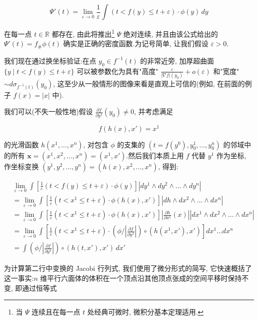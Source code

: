 \[
\Psi'(t) = \lim_{\varepsilon\to 0}\frac{1}{\varepsilon}\int(t<f(y)\leq t+\varepsilon)\cdot\phi(y)\, dy
\]

在每一点 $t\in\mathbb{R}$ 都存在, 由此将推出\footnote{当 $\Psi$ 连续且在每一点 $t$ 处经典可微时, 微积分基本定理适用.} $\Psi$ 绝对连续, 并且由该公式给出的 $\Psi'(t) = f_{\#}\phi(t)$ 确实是正确的密度函数.为记号简单, 让我们假设 $\varepsilon>0$.

我们现在通过换坐标验证:在点 $y_0\in f^{-1}(t)$ 的非常近旁, 加厚超曲面 $\{y \mid t<f(y)\leq t+\varepsilon\}$ 可以被参数化为具有"高度" $\frac{\varepsilon}{|\nabla f|(y_0)} + o(\varepsilon)$ 和"宽度" $\sim d\sigma_{f^{-1}(t)}(y_0)$, 这至少从一般情形的图像来看是直观上可信的(例如, 在前面的例子 $f(x) = |x|$ 中).

我们可以(不失一般性地)假设 $\frac{\partial f}{\partial y^1}(y_0)\neq 0$, 并考虑满足

\begin{equation}
f(h(x), x') = x^1\label{eq:c3-135}
\end{equation}

的光滑函数 $h(x^1, \ldots, x^n)$, 对包含 $\phi$ 的支集的 $(t = f(y^0), y_0^1, \ldots, y_0^n)$ 的邻域中的所有 $\boldsymbol{x} = (x^1, x^2, \ldots, x^n) = (x^1, x')$.然后我们本质上用 $f$ 代替 $y^1$ 作为坐标, 作坐标变换 $(y^1, y^2, \ldots, y^n) = (h(x), x^2, \ldots, x^n)$, 得到:

\[
\begin{aligned}
&\lim_{\varepsilon\to 0}\int\left[\frac{1}{\varepsilon}(t<f(y)\leq t+\varepsilon)\cdot\phi(y)\right]|dy^1\wedge dy^2\wedge\ldots\wedge dy^n| \\
&= \lim_{\varepsilon\to 0}\int\left[\frac{1}{\varepsilon}(t<x^1\leq t+\varepsilon)\cdot\phi(h(x), x')\right]|dh\wedge dx^2\wedge\ldots\wedge dx^n| \\
&= \lim_{\varepsilon\to 0}\int\left[\frac{1}{\varepsilon}(t<x^1\leq t+\varepsilon)\cdot\phi(h(x), x')\right]\left|\frac{\partial h}{\partial x^1}(x)\right||dx^1\wedge dx^2\wedge\ldots\wedge dx^n| \\
&= \lim_{\varepsilon\to 0}\int\left[\frac{1}{\varepsilon}(t<x^1\leq t+\varepsilon)\cdot\left(\phi/\left|\frac{\partial f}{\partial y^1}\right|\right)\circ(h(x^1, x'), x')\right]dx^1\ldots dx^n \\
&= \int\left(\phi/\left|\frac{\partial f}{\partial y^1}\right|\right)\circ(h(t, x'), x')\, dx'
\end{aligned}
\]

为计算第二行中变换的 Jacobi 行列式, 我们使用了微分形式的简写, 它快速概括了这一事实:$n$ 维平行六面体的体积在一个顶点沿其他顶点张成的空间平移时保持不变, 即通过恒等式

